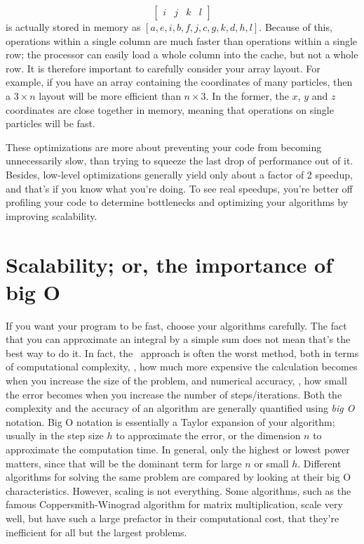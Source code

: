 \documentclass[openany,oneside]{report}
\begin{document}
\begin{itemize}
\begin{equation*}
\begin{bmatrix}
        i & j & k & l
    \end{bmatrix}
    \end{equation*}
    is actually stored in memory as $\left[a,e,i,b,f,j,c,g,k,d,h,l\right]$.
    Because of this, operations within a single column are much faster than operations within a single row; the processor can easily load a whole column into the cache, but not a whole row.
    It is therefore important to carefully consider your array layout.
    For example, if you have an array containing the coordinates of many particles, then a $3\times n$ layout will be more efficient than $n\times 3$.
    In the former, the $x$, $y$ and $z$ coordinates are close together in memory, meaning that operations on single particles will be fast.
\end{itemize}
These optimizations are more about preventing your code from becoming unnecessarily slow, than trying to squeeze the last drop of performance out of it.
Besides, low-level optimizations generally yield only about a factor of 2 speedup, and that's if you know what you're doing.
To see real speedups, you're better off profiling your code to determine bottlenecks and optimizing your algorithms by improving scalability.

\section{Scalability; or, the importance of big O}

If you want your program to be fast, choose your algorithms carefully.
The fact that you can approximate an integral by a simple sum does not mean that's the best way to do it.
In fact, the \naive\ approach is often the worst method, both in terms of computational complexity, \ie, how much more expensive the calculation becomes when you increase the size of the problem, and numerical accuracy, \ie, how small the error becomes when you increase the number of steps/iterations.
Both the complexity and the accuracy of an algorithm are generally quantified using \emph{big O} notation.
Big O notation is essentially a Taylor expansion of your algorithm; usually in the step size $h$ to approximate the error, or the dimension $n$ to approximate the computation time.
In general, only the highest or lowest power matters, since that will be the dominant term for large $n$ or small $h$.
Different algorithms for solving the same problem are compared by looking at their big O characteristics.
However, scaling is not everything.
Some algorithms, such as the famous Coppersmith-Winograd algorithm for matrix multiplication, scale very well, but have such a large prefactor in their computational cost, that they're inefficient for all but the largest problems.
\end{document}
